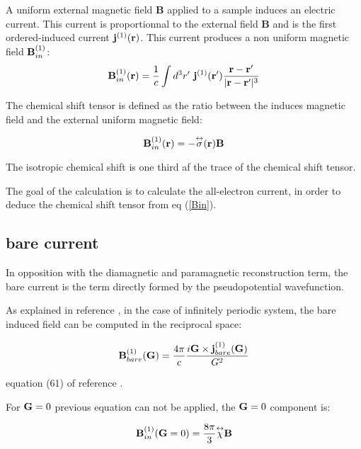 \documentclass[11pt, a4paper]{article}
\begin{document}
A uniform external magnetic field {\bf B} applied to a sample induces
an electric current. This current is proportionnal to the external
field {\bf B} and is the first ordered-induced current ${\bf
  j}^{(1)}({\bf r})$. This current produces a non uniform magnetic
field ${\bf B}_{in}^{(1)}$:
\begin{equation}
{\bf B}_{in}^{(1)}({\bf r})=\frac{1}{c}\int d^3r'\ {\bf  j}^{(1)}({\bf
  r'}) \frac{{\bf r}-{\bf r}'}{|{\bf r}-{\bf r}'|^3}
\label{Bin}
\end{equation}

The chemical shift tensor is defined as the ratio between the induces
magnetic field and the external uniform magnetic field:

\begin{equation}
{\bf B}_{in}^{(1)}({\bf r})=-\overset{\leftrightarrow}{\sigma}({\bf
  r}){\bf B}
\end{equation}

The isotropic chemical shift is one third af the trace of the chemical
shift tensor.

The goal of the calculation is to calculate the all-electron current,
in order to deduce the chemical shift tensor from eq (\ref{Bin}).

\subsection{bare current}

In opposition with the diamagnetic and paramagnetic reconstruction
term, the bare current is the term directly formed by the
pseudopotential wavefunction.

As explained in reference \cite{PRB_GIPAW}, in the case of infinitely
periodic system, the bare induced field can be computed in the
reciprocal space:

\begin{equation}
{\bf B}_{bare}^{(1)}({\bf G})= \frac{4\pi}{c}\frac{i{\bf G}\times{\bf
    j}_{bare}^{(1)}(\bf G)}{G^2}
\end{equation}

equation (61) of reference \cite{PRB_GIPAW}.

For ${\bf G}=0$ previous equation can not be applied, the ${\bf G}=0$
component is:

\begin{equation}
{\bf B}_{in}^{(1)}({\bf G}=0)=
\frac{8\pi}{3}\overset{\leftrightarrow}{\chi}{\bf B}
\end{equation}
\end{document}

